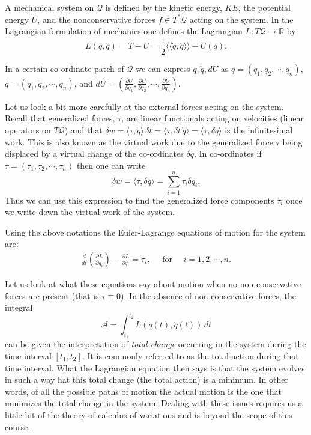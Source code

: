 \documentclass[graybox,envcountchap,sectrefs]{svmonoMuga}
\begin{document}
A mechanical system on $\mathcal{Q}$ is defined by the kinetic energy, $KE$, the potential energy $U$, and the nonconservative forces $f\in T^*\mathcal{Q}$ acting on the system. In the Lagrangian formulation of mechanics one defines the Lagrangian ${L}:T\mathcal{Q}\to \mathbb{R}$ by
\[
{L}(q,\dot{q})=T-U=\frac{1}{2}\langle\langle \dot{q},\dot{q}\rangle\rangle-U(q).
\]
 
In a certain co-ordinate patch of $\mathcal{Q}$ we can express $q,\dot{q},dU$ as
$q=(q_1,q_2,\cdots,q_n)$, $\dot{q}=(\dot{q}_1,\dot{q}_2,\cdots,\dot{q}_n)$, and
$dU=(\frac{\partial U}{\partial q_1},\frac{\partial U}{\partial q_2},\cdots,\frac{\partial U}{\partial q_n})$.


Let us look a bit more carefully at the external forces acting on the system. Recall that generalized forces, $\tau$, are linear functionals acting on velocities (linear operators on $T\mathcal{Q}$) and that $\delta w=\langle \tau, \dot{q}\rangle\,\delta t=\langle \tau,\delta t\,\dot{q}\rangle=\langle \tau,\delta q\rangle$ is the infinitesimal work. This is also known as the virtual work due to the generalized force $\tau$ being displaced by a virtual change of the co-ordinates $\delta q$. 
In co-ordinates if 
$\tau=(\tau_1,\tau_2,\cdots,\tau_n)$ then one can write 
\[
\delta w=\langle \tau,\delta q\rangle=\sum_{i=1}^n\tau_i\delta q_i.
\]
Thus we can use this expression to find the generalized force components $\tau_i$ once we write down the virtual work of the system.

Using the above notations the Euler-Lagrange equations of motion for the system are:
\begin{align}
\frac{d}{dt}\left(\frac{\partial L}{\partial{\dot{q}_i}}\right)-\frac{\partial L}{\partial{{q}_i}}=\tau_i,\:\:\:\:\:\:\mbox{for}\:\:\:\:\:\: i=1,2,\cdots,n.
\end{align}

Let us look at what these equations say about motion  when no non-conservative forces are present (that is $\tau\equiv 0$). In the absence of non-conservative forces, the integral 
\[
\mathcal{A}=\int_{t_1}^{t_2}L(q(t),\dot{q}(t))\,dt
\]
can be given the interpretation of \textit{total change} occurring in the system during the time interval $[t_1,t_2]$. It is commonly referred to as the total action during that time interval. What the Lagrangian equation then says is that the system evolves in such a way hat this total change (the total action) is a minimum. In other words, of all the possible paths of motion the actual motion is the one that minimizes the total change in the system. Dealing with these issues requires us a little bit of the theory of calculus of variations and is beyond the scope of this course.
\end{document}
